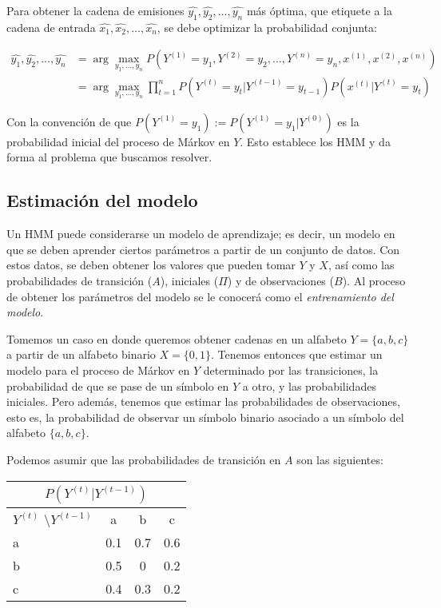 Para obtener la cadena de emisiones $\hat{y_1}, \hat{y_2}, ... , \hat{y_n}$ más óptima, que etiquete a la cadena de entrada $\hat{x_1}, \hat{x_2}, ... , \hat{x_n}$, se debe optimizar la probabilidad conjunta:

\begin{align}
    \hat{y_1}, \hat{y_2}, ... , \hat{y_n} &= \arg\max_{y_1,...,y_n} P(Y^{(1)}=y_1, Y^{(2)}=y_2,...,Y^{(n)}=y_n, x^{(1)}, x^{(2)}, x^{(n)}) \nonumber \\
    &= \arg\max_{y_1,...,y_n} \prod_{t=1}^n P(Y^{(t)}=y_t | Y^{(t-1)}=y_{t-1}) P(x^{(t)}|Y^{(t)}=y_t) \label{eq:HMM}
\end{align}

Con la convención de que $P(Y^{(1)}=y_1) :=P(Y^{(1)}=y_1 | Y^{(0)})$ es la probabilidad inicial del proceso de Márkov en $Y$. Esto establece los HMM y da forma al problema que buscamos resolver.
    




\subsection{Estimación del modelo}

Un HMM puede considerarse un modelo de aprendizaje; es decir, un modelo en que se deben aprender ciertos parámetros a partir de un conjunto de datos. Con estos datos, se deben obtener los valores que pueden tomar $Y$ y $X$, así como las probabilidades de transición ($A$), iniciales ($\Pi$) y de observaciones ($B$). Al proceso de obtener los parámetros del modelo se le conocerá como el \emph{entrenamiento del modelo}.

Tomemos un caso en donde queremos obtener cadenas en un alfabeto $Y = \{a,b,c\}$ a partir de un alfabeto binario $X = \{0,1\}$. Tenemos entonces que estimar un modelo para el proceso de Márkov en $Y$ determinado por las transiciones, la probabilidad de que se pase de un símbolo en $Y$ a otro, y las probabilidades iniciales. Pero además, tenemos que estimar las probabilidades de observaciones, esto es, la probabilidad de observar un símbolo binario asociado a un símbolo del alfabeto $\{a,b,c\}$.

Podemos asumir que las probabilidades de transición en $A$ son las siguientes:

\begin{center}
 \begin{tabular}{l|ccc}
  \multicolumn{4}{c}{$P(Y^{(t)}|Y^{(t-1)})$} \\ \hline
  $Y^{(t)}$ \textbackslash $Y^{(t-1)}$          & a & b & c \\ \hline
  a &    0.1   &    0.7  & 0.6 \\
  b   &    0.5   &    0  & 0.2 \\
  c    &    0.4    &   0.3  & 0.2
 \end{tabular}
 \end{center}

